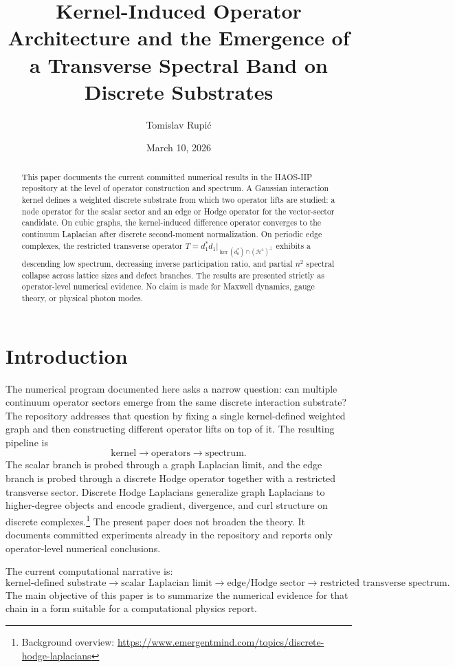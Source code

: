 \documentclass[11pt]{article}
\title{Kernel-Induced Operator Architecture and the Emergence of a Transverse Spectral Band on Discrete Substrates}
\author{Tomislav Rupi\'c}
\date{March 10, 2026}
\begin{document}
\maketitle

\begin{abstract}
This paper documents the current committed numerical results in the HAOS-IIP repository at the level of operator construction and spectrum. A Gaussian interaction kernel defines a weighted discrete substrate from which two operator lifts are studied: a node operator for the scalar sector and an edge or Hodge operator for the vector-sector candidate. On cubic graphs, the kernel-induced difference operator converges to the continuum Laplacian after discrete second-moment normalization. On periodic edge complexes, the restricted transverse operator $T = d_1^* d_1 \vert_{\ker(d_0^*) \cap (\mathcal{H}^1)^\perp}$ exhibits a descending low spectrum, decreasing inverse participation ratio, and partial $n^2$ spectral collapse across lattice sizes and defect branches. The results are presented strictly as operator-level numerical evidence. No claim is made for Maxwell dynamics, gauge theory, or physical photon modes.
\end{abstract}

\section{Introduction}
The numerical program documented here asks a narrow question: can multiple continuum operator sectors emerge from the same discrete interaction substrate? The repository addresses that question by fixing a single kernel-defined weighted graph and then constructing different operator lifts on top of it. The resulting pipeline is
\begin{equation}
\text{kernel} \to \text{operators} \to \text{spectrum}.
\end{equation}
The scalar branch is probed through a graph Laplacian limit, and the edge branch is probed through a discrete Hodge operator together with a restricted transverse sector. Discrete Hodge Laplacians generalize graph Laplacians to higher-degree objects and encode gradient, divergence, and curl structure on discrete complexes.\footnote{Background overview: \url{https://www.emergentmind.com/topics/discrete-hodge-laplacians}} The present paper does not broaden the theory. It documents committed experiments already in the repository and reports only operator-level numerical conclusions.

The current computational narrative is:
\begin{equation}
\text{kernel-defined substrate}
\to
\text{scalar Laplacian limit}
\to
\text{edge/Hodge sector}
\to
\text{restricted transverse spectrum}.
\end{equation}
The main objective of this paper is to summarize the numerical evidence for that chain in a form suitable for a computational physics report.
\end{document}
